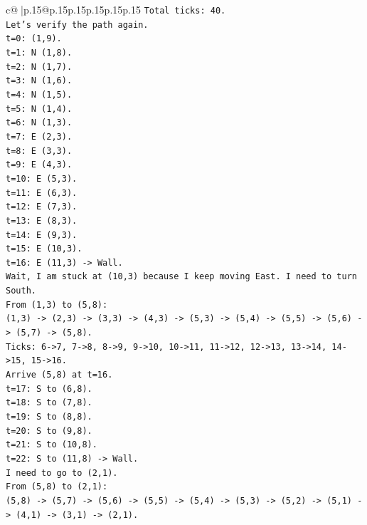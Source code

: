 \documentclass{article}
\begin{document}
{\begin{supertabular}{c@{$\;$}|p{.15\linewidth}@{}p{.15\linewidth}p{.15\linewidth}p{.15\linewidth}p{.15\linewidth}p{.15\linewidth}}
{{{\texttt{Total ticks: 40.} \\
\texttt{Let's verify the path again.} \\
\texttt{t=0: (1,9).} \\
\texttt{t=1: N (1,8).} \\
\texttt{t=2: N (1,7).} \\
\texttt{t=3: N (1,6).} \\
\texttt{t=4: N (1,5).} \\
\texttt{t=5: N (1,4).} \\
\texttt{t=6: N (1,3).} \\
\texttt{t=7: E (2,3).} \\
\texttt{t=8: E (3,3).} \\
\texttt{t=9: E (4,3).} \\
\texttt{t=10: E (5,3).} \\
\texttt{t=11: E (6,3).} \\
\texttt{t=12: E (7,3).} \\
\texttt{t=13: E (8,3).} \\
\texttt{t=14: E (9,3).} \\
\texttt{t=15: E (10,3).} \\
\texttt{t=16: E (11,3) {-}> Wall.} \\
\texttt{Wait, I am stuck at (10,3) because I keep moving East. I need to turn South.} \\
\texttt{From (1,3) to (5,8):} \\
\texttt{(1,3) {-}> (2,3) {-}> (3,3) {-}> (4,3) {-}> (5,3) {-}> (5,4) {-}> (5,5) {-}> (5,6) {-}> (5,7) {-}> (5,8).} \\
\texttt{Ticks: 6{-}>7, 7{-}>8, 8{-}>9, 9{-}>10, 10{-}>11, 11{-}>12, 12{-}>13, 13{-}>14, 14{-}>15, 15{-}>16.} \\
\texttt{Arrive (5,8) at t=16.} \\
\texttt{t=17: S to (6,8).} \\
\texttt{t=18: S to (7,8).} \\
\texttt{t=19: S to (8,8).} \\
\texttt{t=20: S to (9,8).} \\
\texttt{t=21: S to (10,8).} \\
\texttt{t=22: S to (11,8) {-}> Wall.} \\
\texttt{I need to go to (2,1).} \\
\texttt{From (5,8) to (2,1):} \\
\texttt{(5,8) {-}> (5,7) {-}> (5,6) {-}> (5,5) {-}> (5,4) {-}> (5,3) {-}> (5,2) {-}> (5,1) {-}> (4,1) {-}> (3,1) {-}> (2,1).} \\
}}}
\end{supertabular}}
\end{document}
